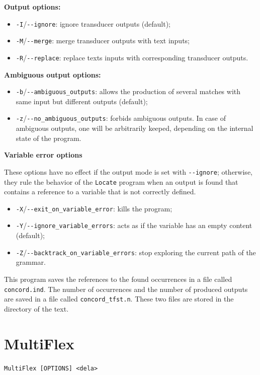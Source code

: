\bigskip
\noindent \textbf{Output options:}
\begin{itemize}
  \item \verb+-I+/\verb+--ignore+: ignore transducer outputs (default);
  \item \verb+-M+/\verb+--merge+: merge transducer outputs with text inputs;
  \item \verb+-R+/\verb+--replace+: replace texts inputs with corresponding
  transducer outputs.
\end{itemize}

\bigskip
\noindent \textbf{Ambiguous output options:}
\begin{itemize}
  \item \verb+-b+/\verb+--ambiguous_outputs+: allows the production of several 
  matches with same input but different outputs (default);
  \item \verb+-z+/\verb+--no_ambiguous_outputs+: forbids ambiguous outputs. In
  case of ambiguous outputs, one will be arbitrarily keeped, depending on the
  internal state of the program.
\end{itemize}

\bigskip
\noindent \textbf{Variable error options}

\noindent These options have no effect if the output mode is set with
\verb+--ignore+; otherwise, they rule the behavior of the \verb+Locate+ program
when an output is found that contains a reference to a variable that is not correctly defined.
\begin{itemize}
  \item \verb+-X+/\verb+--exit_on_variable_error+: kills the program;
  \item \verb+-Y+/\verb+--ignore_variable_errors+: acts as if the variable has
  an empty content (default);
  \item \verb+-Z+/\verb+--backtrack_on_variable_errors+: stop exploring the
  current path of the grammar.
\end{itemize}
  

\bigskip
\noindent {}This 
program saves the references to the found occurrences in a file called
\verb+concord.ind+. The number of occurrences and the number of produced outputs
are saved in a file called \verb+concord_tfst.n+. These two files are stored in the
directory of the text.







\section{MultiFlex}
\verb+MultiFlex [OPTIONS] <dela>+

